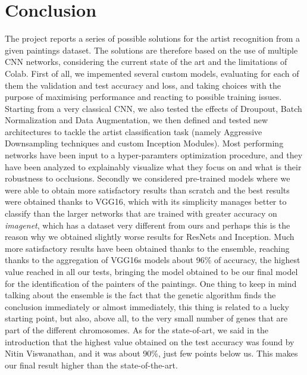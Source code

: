 \section{Conclusion}
The project reports a series of possible solutions for the artist recognition from a given paintings dataset. The solutions are therefore based on the use of multiple CNN networks, considering the current state of the art and the limitations of Colab.
First of all, we impemented several custom models, evaluating for each of them the validation and test accuracy and loss, and taking choices with the purpose of maximising performance and reacting to possible training issues. Starting from a very classical CNN, we also tested the effects of Droupout, Batch Normalization and Data Augmentation, we then defined and tested new architectures to tackle the artist classification task (namely Aggressive Downsampling techniques and custom Inception Modules). Most performing networks have been input to a hyper-paramters optimization procedure, and they have been analyzed to explainably visualize what they focus on and what is their robustness to occlusions.
Secondly we considered pre-trained models where we were able to obtain more satisfactory results than scratch and the best results were obtained thanks to VGG16, which with its simplicity manages better to classify than the larger networks that are trained with greater accuracy on \textit{imagenet}, which has a dataset very different from ours and perhaps this is the reason why we obtained slightly worse results for ResNets and Inception. 
Much more satisfactory results have been obtained thanks to the ensemble, reaching thanks to the aggregation of VGG16s models about 96\% of accuracy, the highest value reached in all our tests, bringing the model obtained to be our final model for the identification of the painters of the paintings. One thing to keep in mind talking about the ensemble is the fact that the genetic algorithm finds the conclusion immediately or almost immediately, this thing is related to a lucky starting point, but also, above all, to the very small number of genes that are part of the different chromosomes.
As for the state-of-art, we said in the introduction that the highest value obtained on the test accuracy was found by Nitin Viswanathan, and it was about 90\%, just few points below us. This makes our final result higher than the state-of-the-art.